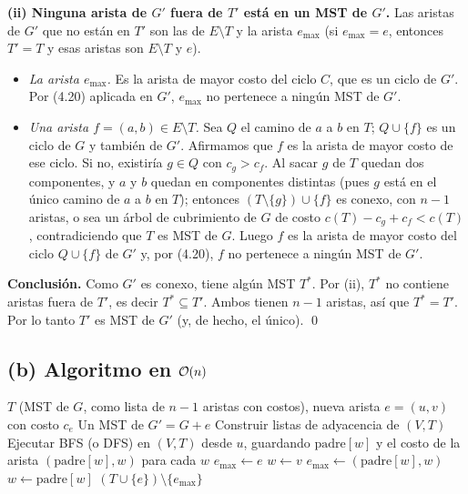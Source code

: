 \textbf{(ii) Ninguna arista de $G'$ fuera de $T'$ está en un MST de $G'$.} Las aristas de $G'$ que no están en $T'$ son las de $E\setminus T$ y la arista $e_{\max}$ (si $e_{\max}=e$, entonces $T'=T$ y esas aristas son $E\setminus T$ y $e$).

\begin{itemize}
\item \emph{La arista $e_{\max}$.} Es la arista de mayor costo del ciclo $C$, que es un ciclo de $G'$. Por (4.20) aplicada en $G'$, $e_{\max}$ no pertenece a ningún MST de $G'$.
\item \emph{Una arista $f=(a,b)\in E\setminus T$.} Sea $Q$ el camino de $a$ a $b$ en $T$; $Q\cup\{f\}$ es un ciclo de $G$ y también de $G'$. Afirmamos que $f$ es la arista de mayor costo de ese ciclo. Si no, existiría $g\in Q$ con $c_g>c_f$. Al sacar $g$ de $T$ quedan dos componentes, y $a$ y $b$ quedan en componentes distintas (pues $g$ está en el único camino de $a$ a $b$ en $T$); entonces $(T\setminus\{g\})\cup\{f\}$ es conexo, con $n-1$ aristas, o sea un árbol de cubrimiento de $G$ de costo $c(T)-c_g+c_f<c(T)$, contradiciendo que $T$ es MST de $G$. Luego $f$ es la arista de mayor costo del ciclo $Q\cup\{f\}$ de $G'$ y, por (4.20), $f$ no pertenece a ningún MST de $G'$.
\end{itemize}

\textbf{Conclusión.} Como $G'$ es conexo, tiene algún MST $T^\ast$. Por (ii), $T^\ast$ no contiene aristas fuera de $T'$, es decir $T^\ast\subseteq T'$. Ambos tienen $n-1$ aristas, así que $T^\ast=T'$. Por lo tanto $T'$ es MST de $G'$ (y, de hecho, el único). \qed

\subsection*{(b) Algoritmo en $\mathcal{O}(n)$}

\begin{algorithm}[H]
\caption{Actualizar el MST al agregar una arista}
\begin{algorithmic}[1]
\Require $T$ (MST de $G$, como lista de $n-1$ aristas con costos), nueva arista $e=(u,v)$ con costo $c_e$
\Ensure Un MST de $G'=G+e$
\State Construir listas de adyacencia de $(V,T)$
\State Ejecutar BFS (o DFS) en $(V,T)$ desde $u$, guardando $\mathrm{padre}[w]$ y el costo de la arista $(\mathrm{padre}[w],w)$ para cada $w$
\State $e_{\max}\gets e$
\State $w\gets v$
 
     \State $e_{\max}\gets (\mathrm{padre}[w],w)$
  \EndIf
  \State $w\gets \mathrm{padre}[w]$
\EndWhile
\State \Return $(T\cup\{e\})\setminus\{e_{\max}\}$
\end{algorithmic}
\end{algorithm}

